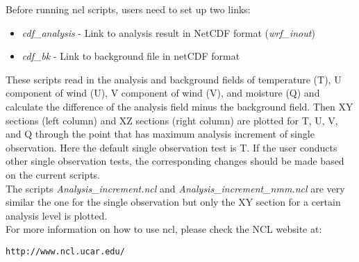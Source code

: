 Before running ncl scripts, users need to set up two links:
\begin{itemize}
\item \textit{cdf\_analysis}  - Link to analysis result in NetCDF format (\textit{wrf\_inout})
\item \textit{cdf\_bk} - Link to background file in netCDF format
\end{itemize}
These scripts read in the analysis and background fields of temperature (T), U component of wind (U), V component of wind (V), and moisture (Q) and calculate the difference of the analysis field minus the background field. Then XY sections (left column) and XZ sections (right column) are plotted for T, U, V, and Q through the point that has maximum analysis increment of single observation. Here the default single observation test is T. If the user conducts other single observation tests, the corresponding changes should be made based on the current scripts.\\

The scripts \textit{Analysis\_increment.ncl} and \textit{Analysis\_increment\_nmm.ncl} are very similar the one for the single observation but only the XY section for a certain analysis level is plotted.\\

For more information on how to use ncl, please check the NCL website at:
\begin{scriptsize}
\begin{verbatim}  
http://www.ncl.ucar.edu/
\end{verbatim}
\end{scriptsize}

 




